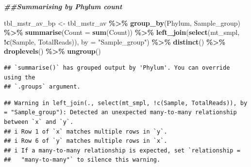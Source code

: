 \documentclass[
]{article}
\newenvironment{Shaded}{\begin{snugshade}}{\end{snugshade}}
\newcommand{\AttributeTok}[1]{\textcolor[rgb]{0.13,0.29,0.53}{#1}}
\newcommand{\DocumentationTok}[1]{\textcolor[rgb]{0.56,0.35,0.01}{\textbf{\textit{#1}}}}
\newcommand{\FunctionTok}[1]{\textcolor[rgb]{0.13,0.29,0.53}{\textbf{#1}}}
\newcommand{\NormalTok}[1]{#1}
\newcommand{\OtherTok}[1]{\textcolor[rgb]{0.56,0.35,0.01}{#1}}
\newcommand{\SpecialCharTok}[1]{\textcolor[rgb]{0.81,0.36,0.00}{\textbf{#1}}}
\newcommand{\StringTok}[1]{\textcolor[rgb]{0.31,0.60,0.02}{#1}}
\begin{document}
\begin{Shaded}
\begin{Highlighting}[]
\DocumentationTok{\#\#Summarising by Phylum count}

\NormalTok{tbl\_mstr\_av\_bp }\OtherTok{\textless{}{-}}\NormalTok{ tbl\_mstr\_av }\SpecialCharTok{\%\textgreater{}\%}
  \FunctionTok{group\_by}\NormalTok{(Phylum, Sample\_group) }\SpecialCharTok{\%\textgreater{}\%}
  \FunctionTok{summarise}\NormalTok{(}\AttributeTok{Count =} \FunctionTok{sum}\NormalTok{(Count)) }\SpecialCharTok{\%\textgreater{}\%}
  \FunctionTok{left\_join}\NormalTok{(}\FunctionTok{select}\NormalTok{(mt\_smpl, }\SpecialCharTok{!}\FunctionTok{c}\NormalTok{(Sample, TotalReads)), }\AttributeTok{by =} \StringTok{"Sample\_group"}\NormalTok{) }\SpecialCharTok{\%\textgreater{}\%}
  \FunctionTok{distinct}\NormalTok{() }\SpecialCharTok{\%\textgreater{}\%}
  \FunctionTok{droplevels}\NormalTok{() }\SpecialCharTok{\%\textgreater{}\%}
  \FunctionTok{ungroup}\NormalTok{()}
\end{Highlighting}
\end{Shaded}

\begin{verbatim}
## `summarise()` has grouped output by 'Phylum'. You can override using the
## `.groups` argument.
\end{verbatim}

\begin{verbatim}
## Warning in left_join(., select(mt_smpl, !c(Sample, TotalReads)), by = "Sample_group"): Detected an unexpected many-to-many relationship between `x` and `y`.
## i Row 1 of `x` matches multiple rows in `y`.
## i Row 6 of `y` matches multiple rows in `x`.
## i If a many-to-many relationship is expected, set `relationship =
##   "many-to-many"` to silence this warning.
\end{verbatim}
\end{document}
